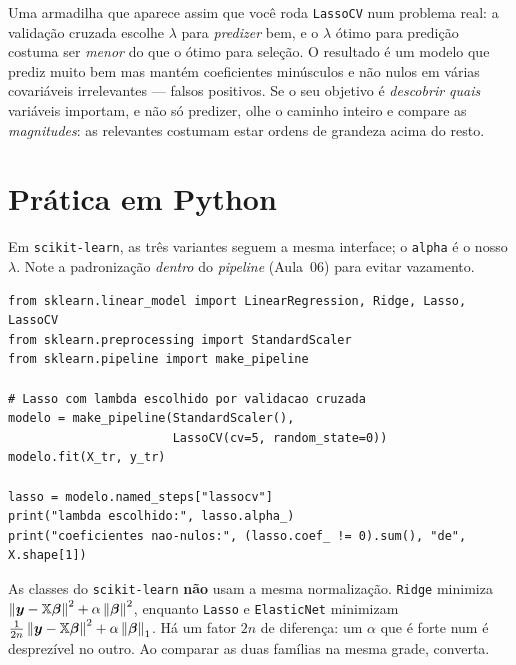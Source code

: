 \documentclass[11pt,a4paper]{article}
\begin{document}
\begin{atencao}
Uma armadilha que aparece assim que você roda \texttt{LassoCV} num problema real: a
validação cruzada escolhe $\lambda$ para \emph{predizer} bem, e o $\lambda$ ótimo
para predição costuma ser \emph{menor} do que o ótimo para seleção. O resultado é um
modelo que prediz muito bem mas mantém coeficientes minúsculos e não nulos em várias
covariáveis irrelevantes --- falsos positivos. Se o seu objetivo é \emph{descobrir
quais} variáveis importam, e não só predizer, olhe o caminho inteiro e compare as
\emph{magnitudes}: as relevantes costumam estar ordens de grandeza acima do resto.
\end{atencao}

\section{Prática em Python}
Em \texttt{scikit-learn}, as três variantes seguem a mesma interface; o
\texttt{alpha} é o nosso $\lambda$. Note a padronização \emph{dentro} do
\emph{pipeline} (Aula~06) para evitar vazamento.
\begin{lstlisting}
from sklearn.linear_model import LinearRegression, Ridge, Lasso, LassoCV
from sklearn.preprocessing import StandardScaler
from sklearn.pipeline import make_pipeline

# Lasso com lambda escolhido por validacao cruzada
modelo = make_pipeline(StandardScaler(),
                       LassoCV(cv=5, random_state=0))
modelo.fit(X_tr, y_tr)

lasso = modelo.named_steps["lassocv"]
print("lambda escolhido:", lasso.alpha_)
print("coeficientes nao-nulos:", (lasso.coef_ != 0).sum(), "de", X.shape[1])
\end{lstlisting}

\begin{atencao}
As classes do \texttt{scikit-learn} \textbf{não} usam a mesma normalização.
\texttt{Ridge} minimiza $\left\lVert \bm{y}-\mathbb{X}\bm{\beta} \right\rVert^2+\alpha\left\lVert \bm{\beta} \right\rVert^2$, enquanto
\texttt{Lasso} e \texttt{ElasticNet} minimizam
$\tfrac{1}{2n}\left\lVert \bm{y}-\mathbb{X}\bm{\beta} \right\rVert^2+\alpha\left\lVert \bm{\beta} \right\rVert_1$. Há um fator $2n$ de
diferença: um $\alpha$ que é forte num é desprezível no outro. Ao comparar as duas
famílias na mesma grade, converta.
\end{atencao}
\end{document}
